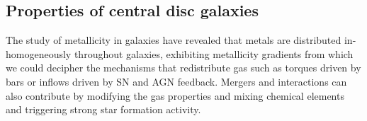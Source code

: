 \documentclass[a4paper,fleqn,usenatbib,letter]{mnras}
\begin{document}





\subsection{Properties of central disc galaxies}

The study of metallicity in galaxies have revealed that metals are distributed in-homogeneously throughout  galaxies, exhibiting  metallicity gradients from which we could decipher the mechanisms that  redistribute  gas  such as  torques driven by bars or inflows driven by SN and AGN feedback.  Mergers and interactions can also contribute by modifying the gas properties and  mixing chemical elements and triggering strong star formation activity. 
\end{document}
